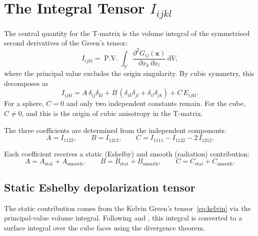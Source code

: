\documentclass[11pt,a4paper]{article}
\newcommand{\bx}{\mathbf{x}}
\newcommand{\dd}{\mathrm{d}}
\newcommand{\PV}{\operatorname{P.V.}}
\begin{document}
\section{The Integral Tensor \texorpdfstring{$I_{ijkl}$}{I\_ijkl}}
\label{sec:integral}

The central quantity for the T-matrix is the volume integral of the
symmetrised second derivatives of the Green's tensor:
\begin{equation}
  I_{ijkl} = \PV \int_V
    \frac{\partial^2 G_{ij}(\bx)}{\partial x_k \,\partial x_l}
    \,\dd V,
  \label{eq:Idef}
\end{equation}
where the principal value excludes the origin singularity. By
cubic symmetry, this decomposes as
\begin{equation}
  \boxed{
  I_{ijkl} = A\,\delta_{ij}\delta_{kl}
    + B\,(\delta_{ik}\delta_{jl} + \delta_{il}\delta_{jk})
    + C\,E_{ijkl}.
  }
  \label{eq:Idecomp}
\end{equation}
For a sphere, $C = 0$ and only two independent constants remain.
For the cube, $C \neq 0$, and this is the origin of cubic anisotropy
in the T-matrix.

The three coefficients are determined from the independent
components:
\begin{equation}
  A = I_{1122}, \qquad
  B = I_{1212}, \qquad
  C = I_{1111} - I_{1122} - 2\,I_{1212}.
  \label{eq:ABC_from_I}
\end{equation}

Each coefficient receives a static (Eshelby) and smooth (radiation)
contribution:
\begin{equation}
  A = A_\text{stat} + A_\text{smooth}, \qquad
  B = B_\text{stat} + B_\text{smooth}, \qquad
  C = C_\text{stat} + C_\text{smooth}.
  \label{eq:split}
\end{equation}

\subsection{Static Eshelby depolarization tensor}
\label{sec:eshelby}

The static contribution comes from the Kelvin Green's
tensor~\eqref{eq:kelvin} via the principal-value volume
integral. Following \citet{Eshelby1957} and \citet{Mura1987},
this integral is converted to a surface integral over the
cube faces using the divergence theorem.
\end{document}
